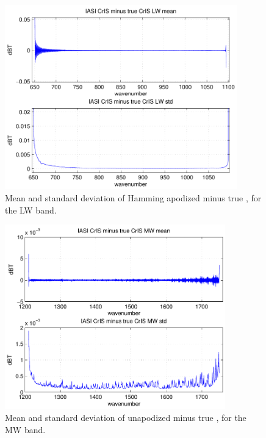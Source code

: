 \documentclass[12pt]{article}
\begin{document}
\begin{figure}
  \centering
  \includegraphics[height=8cm]{figures/iasi_cris_lw_2.pdf}
  \caption{Mean and standard deviation of Hamming apodized {\iasi}
    {\cris} minus true {\cris}, for the {\cris} LW band.}
  \label{iclw2}
\end{figure}

\begin{figure}
  \centering
  \includegraphics[height=8cm]{figures/iasi_cris_mw_1.pdf}
  \caption{Mean and standard deviation of unapodized {\iasi} {\cris}
    minus true {\cris}, for the {\cris} MW band.}
  \label{icmw1}
\end{figure}
\end{document}
